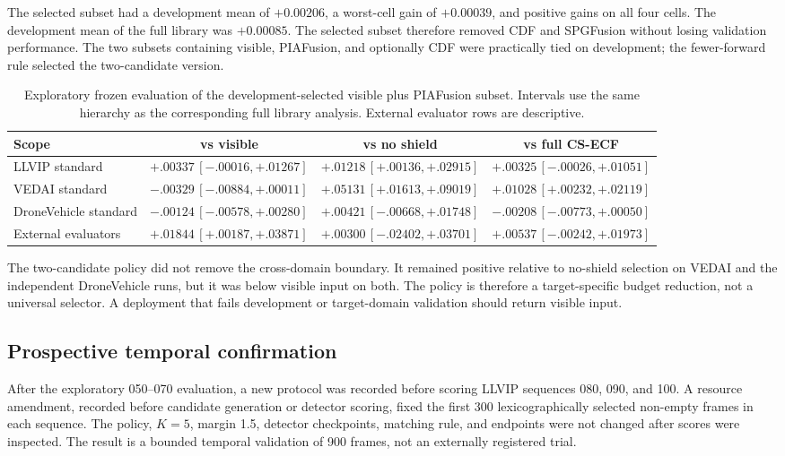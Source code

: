 \documentclass[11pt]{article}
\begin{document}
The selected subset had a development mean of \(+0.00206\), a worst-cell gain
of \(+0.00039\), and positive gains on all four cells. The development mean of
the full library was \(+0.00085\). The selected subset therefore removed CDF
and SPGFusion without losing validation performance. The two subsets containing
visible, PIAFusion, and optionally CDF were practically tied on development;
the fewer-forward rule selected the two-candidate version.

\begin{table}[ht]
\centering
\small
\setlength{\tabcolsep}{3pt}
\caption{Exploratory frozen evaluation of the development-selected visible plus
PIAFusion subset. Intervals use the same hierarchy as the corresponding full
library analysis. External evaluator rows are descriptive.}
\label{tab:budget-selection-frozen}
\begin{tabular}{@{}lccc@{}}
\toprule
Scope & vs visible & vs no shield & vs full CS-ECF \\
\midrule
LLVIP standard & \(+.00337\,[-.00016,+.01267]\) &
\(+.01218\,[+.00136,+.02915]\) & \(+.00325\,[-.00026,+.01051]\) \\
VEDAI standard & \(-.00329\,[-.00884,+.00011]\) &
\(+.05131\,[+.01613,+.09019]\) & \(+.01028\,[+.00232,+.02119]\) \\
DroneVehicle standard & \(-.00124\,[-.00578,+.00280]\) &
\(+.00421\,[-.00668,+.01748]\) & \(-.00208\,[-.00773,+.00050]\) \\
External evaluators & \(+.01844\,[+.00187,+.03871]\) &
\(+.00300\,[-.02402,+.03701]\) & \(+.00537\,[-.00242,+.01973]\) \\
\bottomrule
\end{tabular}
\end{table}

The two-candidate policy did not remove the cross-domain boundary. It remained
positive relative to no-shield selection on VEDAI and the independent
DroneVehicle runs, but it was below visible input on both. The policy is
therefore a target-specific budget reduction, not a universal selector. A
deployment that fails development or target-domain validation should return
visible input.

\subsection{Prospective temporal confirmation}

After the exploratory 050--070 evaluation, a new protocol was recorded before
scoring LLVIP sequences 080, 090, and 100. A resource amendment, recorded
before candidate generation or detector scoring, fixed the first 300
lexicographically selected non-empty frames in each sequence. The policy,
\(K=5\), margin 1.5, detector checkpoints, matching rule, and endpoints were
not changed after scores were inspected. The result is a bounded temporal
validation of 900 frames, not an externally registered trial.
\end{document}
